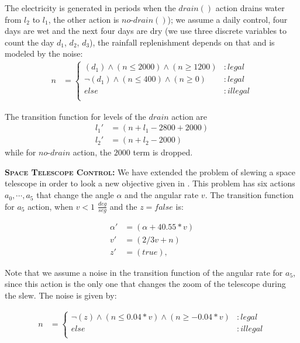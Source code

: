 The electricity is generated in periods when the $\mathit{drain}()$ action
drains water from $l_2$ to $l_1$, the other action is
$\mathit{no}$-$\mathit{drain}()$); we assume a daily control,  four days are wet and the next four days are dry (we use three discrete variables to count the day $d_1$, $d_2$, $d_3$), the rainfall
replenishment depends on that and is modeled by the noise:
{\footnotesize
\begin{align*}
n & = \begin{cases}
(d_1) \wedge (n \leq 2000) \wedge (n \geq 1200) &:legal\\
\neg (d_1) \wedge (n \leq 400) \wedge (n \geq 0) &:legal\\
else &: illegal\\
\end{cases}
\end{align*}}


The transition function for levels of the $\mathit{drain}$ action are
{\footnotesize
\begin{align*}
l_1' & =(n + l_1 - 2800 + 2000) \\
l_2'& =(n + l_2 - 2000)
\end{align*}}
while for $\mathit{no}$-$\mathit{drain}$ action, the $\mathit{2000}$ term is dropped.

{\bf \textsc{Space Telescope Control}:} We have extended the problem of slewing a space telescope
in order to look a new objective given in \cite{DLohr:2012}. This problem has six actions $a_0, \cdots ,a_5$ that change the angle $\alpha$ and the angular rate $v$. The transition function for $a_5$ action, when $v < 1$ $\frac{deg}{seg}$ and the $z= false$ is:

{\footnotesize
\begin{align*}
\alpha' & =( \alpha + 40.55*v) \\
v'& =(2/3 v + n) \\
z'& =( true ),
\end{align*}}

Note that we assume a noise in the transition function of the angular rate for $a_5$, since this action is the only one that changes the zoom of the telescope during the slew. The noise is given by:

{\footnotesize
\begin{align*}
n & = \begin{cases}
\neg (z) \wedge (n \leq 0.04*v) \wedge (n \geq -0.04*v) &:legal\\
else &: illegal\\
\end{cases}
\end{align*}}

